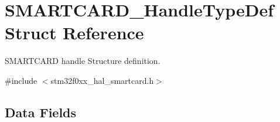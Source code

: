 \hypertarget{struct_s_m_a_r_t_c_a_r_d___handle_type_def}{}\section{S\+M\+A\+R\+T\+C\+A\+R\+D\+\_\+\+Handle\+Type\+Def Struct Reference}
\label{struct_s_m_a_r_t_c_a_r_d___handle_type_def}


S\+M\+A\+R\+T\+C\+A\+RD handle Structure definition.  




{\ttfamily \#include $<$stm32f0xx\+\_\+hal\+\_\+smartcard.\+h$>$}

\subsection*{Data Fields}
